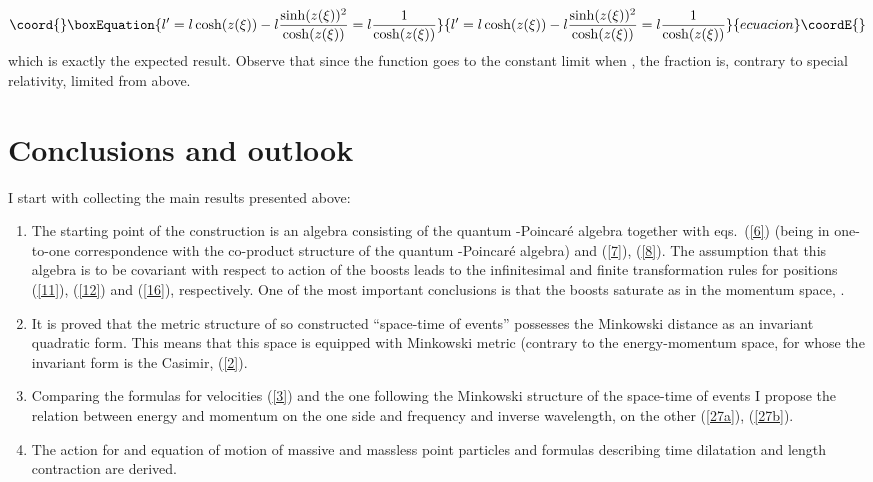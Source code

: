 \documentclass[a4paper,a4paper]{article}
\begin{document}
\begin{equation}\coord{}\boxEquation{\label{35}
 l' = l\cosh(z(\xi)) - l \frac{\sinh(z(\xi))^2}{\cosh(z(\xi))} = l\frac{1}{\cosh(z(\xi))}
}{l' = l\cosh(z(\xi)) - l \frac{\sinh(z(\xi))^2}{\cosh(z(\xi))} = l\frac{1}{\cosh(z(\xi))}
}{ecuacion}\coordE{}\end{equation}
which is exactly the expected result. Observe that since the function \coordHE{} goes to the constant limit when \myHighlight{$\xi\rightarrow\infty$}\coordHE{}, the fraction \coordHE{} is, contrary to special relativity, limited from above. 

\section{Conclusions and outlook}

I start with collecting the main results presented above:

\begin{enumerate}

\item The starting point of the construction is an algebra consisting of the quantum \myHighlight{$\kappa$}\coordHE{}-Poincar\'e algebra together with eqs.~(\ref{6}) (being in one-to-one correspondence with the co-product structure of the quantum \myHighlight{$\kappa$}\coordHE{}-Poincar\'e algebra) and (\ref{7}), (\ref{8}). The assumption that this algebra is to be covariant with respect to action of the boosts leads to the infinitesimal and finite transformation rules for positions (\ref{11}), (\ref{12}) and (\ref{16}), respectively. One of the most important conclusions is that the boosts saturate as in the momentum space, \cite{rbgacjkg}.
\item It is proved that the metric structure of so constructed ``space-time of events'' possesses the Minkowski distance as an invariant quadratic form. This means that this space is \coordHE{} equipped with Minkowski metric (contrary to the energy-momentum space, for whose the invariant form is the Casimir, (\ref{2}).
\item Comparing the formulas for velocities \coordHE{} (\ref{3}) and the one following the Minkowski structure of the space-time of events I propose the relation between energy and momentum on the one side and frequency and inverse wavelength, on the other (\ref{27a}), (\ref{27b}).
\item The action for and equation of motion of massive and massless point particles and formulas describing time dilatation and length contraction are derived. 
\end{enumerate}
\end{document}
